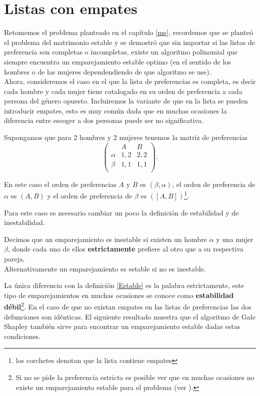 \chapter{Listas con empates}

Retomemos el problema planteado en el capítulo \ref{me}, recordemos que se planteó el problema del matrimonio estable y se demostró que sin importar si las listas de preferencia son completas o incompletas, existe un algoritmo polinomial que siempre encuentra un emparejamiento estable optimo (en el sentido de los hombres o de las mujeres dependendiendo de que algoritmo se use). \\

Ahora, consideremos el caso en el que la lista de preferencias es completa, es decir cada hombre y cada mujer tiene catalogado en su orden de preferencia a cada persona del género opuesto. Incluiremos la variante de que en la lista se pueden introducir empates, esto es muy común dada que en muchas ocasiones la diferencia entre escoger a dos personas puede ser no significativa. 

\begin{eje}{\cite{Verde}}
\label{ejemplo empates}
Supongamos que para 2 hombres y 2 mujeres tenemos la matriz de preferencias 
$$\begin{pmatrix}
& A & B \\
\alpha & 1,2 & 2,2 \\
\beta & 1,1 & 1,1\\
\end{pmatrix}.$$

En este caso el orden de preferencias $A$ y $B$ es $(\beta, \alpha)$, el orden de preferencia de $\alpha$ es $(A,B)$ y el orden de preferencia de $\beta$ es $([A,B])$\footnote{los corchetes denotan que la lista contiene empates}.
\end{eje}

Para este caso es necesario cambiar un poco la definición de estabilidad y de inestabilidad. 

\begin{dfn}{\cite{Verde}}
\label{estricto}
Decimos que un emparejamiento es inestable si existen un hombre $\alpha$ y una mujer $\beta$, donde cada uno de ellos \textbf{estrictamente} prefiere al otro que a su respectiva pareja. \\
Alternativamente un emparejamiento es estable si no es inestable.
\end{dfn}

La única diferencia con la definición \ref{Estable} es la palabra estrictamente, este tipo de emparejamientos en muchas ocasiones se conoce como \textbf{estabilidad débil}\footnote{Si no se pide la preferencia estricta es posible ver que en muchas ocasiones no existe un emparejamiento estable para el problema (ver \cite{Verde}).}. En el caso de que no existan empates en las listas de preferencias las dos defunciones son idénticas. El siguiente resultado muestra que el algoritmo de Gale Shapley también sirve para encontrar un emparejamiento estable dadas estas condiciones.

